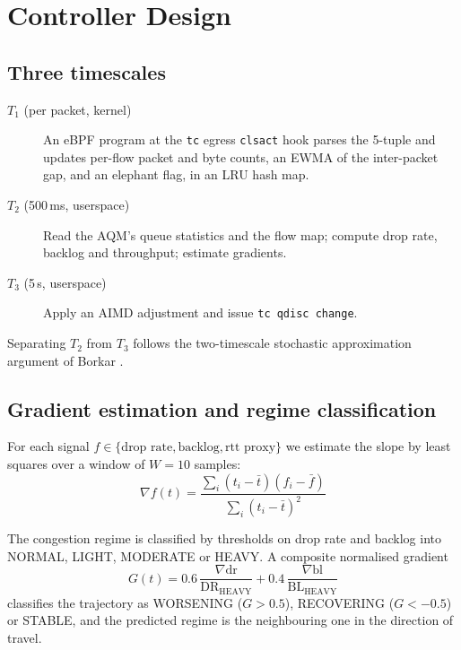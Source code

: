 \documentclass[conference]{IEEEtran}
\begin{document}
\section{Controller Design}
\label{sec:design}

\subsection{Three timescales}

\begin{description}
\item[$T_1$ (per packet, kernel)] An eBPF program at the \texttt{tc} egress
  \texttt{clsact} hook parses the 5-tuple and updates per-flow packet and byte
  counts, an EWMA of the inter-packet gap, and an elephant flag, in an
  LRU hash map.
\item[$T_2$ (500\,ms, userspace)] Read the AQM's queue statistics and the flow
  map; compute drop rate, backlog and throughput; estimate gradients.
\item[$T_3$ (5\,s, userspace)] Apply an AIMD adjustment and issue
  \texttt{tc qdisc change}.
\end{description}

Separating $T_2$ from $T_3$ follows the two-timescale stochastic
approximation argument of Borkar \cite{borkar1997}.

\subsection{Gradient estimation and regime classification}

For each signal $f \in \{\text{drop rate}, \text{backlog}, \text{rtt proxy}\}$
we estimate the slope by least squares over a window of $W = 10$ samples:
\begin{equation}
\nabla f(t) = \frac{\sum_i (t_i - \bar{t})(f_i - \bar{f})}{\sum_i (t_i - \bar{t})^2}
\end{equation}

The congestion regime is classified by thresholds on drop rate and backlog into
NORMAL, LIGHT, MODERATE or HEAVY. A composite normalised gradient
\begin{equation}
G(t) = 0.6\,\frac{\nabla \text{dr}}{\text{DR}_{\text{HEAVY}}}
     + 0.4\,\frac{\nabla \text{bl}}{\text{BL}_{\text{HEAVY}}}
\end{equation}
classifies the trajectory as WORSENING ($G > 0.5$), RECOVERING ($G < -0.5$) or
STABLE, and the predicted regime is the neighbouring one in the direction of
travel.
\end{document}
